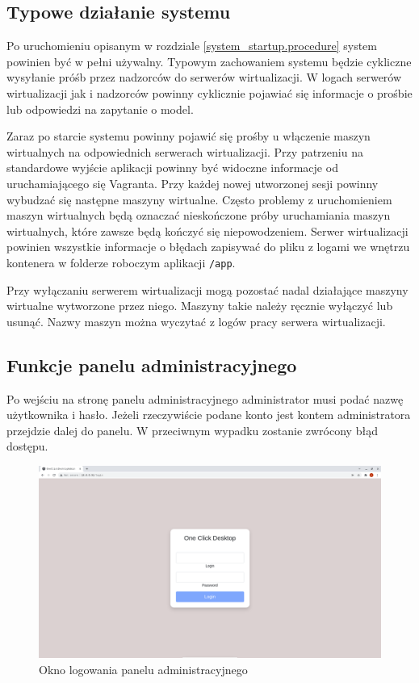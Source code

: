 \documentclass[../opis-rozwiazania.tex]{subfiles}
\begin{document}
\label{system_interaction}

\subsection{Typowe działanie systemu}
Po uruchomieniu opisanym w rozdziale \ref{system_startup.procedure} system powinien być w pełni używalny.
Typowym zachowaniem systemu będzie cykliczne wysyłanie próśb przez nadzorców do serwerów wirtualizacji.
W logach serwerów wirtualizacji jak i nadzorców powinny cyklicznie pojawiać się informacje o prośbie lub odpowiedzi na zapytanie o model.

Zaraz po starcie systemu powinny pojawić się prośby u włączenie maszyn wirtualnych na odpowiednich serwerach wirtualizacji.
Przy patrzeniu na standardowe wyjście aplikacji powinny być widoczne informacje od uruchamiającego się Vagranta.
Przy każdej nowej utworzonej sesji powinny wybudzać się następne maszyny wirtualne.
Często problemy z uruchomieniem maszyn wirtualnych będą oznaczać nieskończone próby uruchamiania maszyn wirtualnych, które zawsze będą kończyć się niepowodzeniem.
Serwer wirtualizacji powinien wszystkie informacje o błędach zapisywać do pliku z logami we wnętrzu kontenera w folderze roboczym aplikacji \texttt{/app}.

Przy wyłączaniu serwerem wirtualizacji mogą pozostać nadal działające maszyny wirtualne wytworzone przez niego.
Maszyny takie należy ręcznie wyłączyć lub usunąć.
Nazwy maszyn można wyczytać z logów pracy serwera wirtualizacji.

\subsection{Funkcje panelu administracyjnego}

Po wejściu na stronę panelu administracyjnego administrator musi podać nazwę użytkownika i hasło.
Jeżeli rzeczywiście podane konto jest kontem administratora przejdzie dalej do panelu.
W przeciwnym wypadku zostanie zwrócony błąd dostępu.

\begin{figure}[H]
	\centering
	\includegraphics[width=\textwidth]{resources/admin_panel_login.png}
	\caption{Okno logowania panelu administracyjnego}
	\label{figure:system_interaction.admin.login}
\end{figure}
\end{document}
